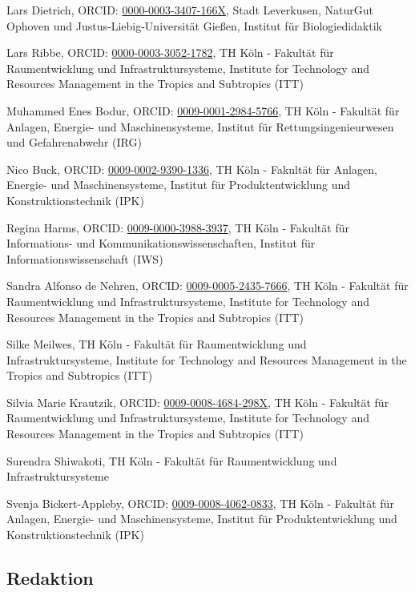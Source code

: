 Lars Dietrich, ORCID:
\href{https://orcid.org/0000-0003-3407-166X}{0000-0003-3407-166X}, Stadt
Leverkusen, NaturGut Ophoven und Justus-Liebig-Universität Gießen,
Institut für Biologiedidaktik

Lars Ribbe, ORCID:
\href{https://orcid.org/0000-0003-3052-1782}{0000-0003-3052-1782}, TH
Köln - Fakultät für Raumentwicklung und Infrastruktursysteme, Institute
for Technology and Resources Management in the Tropics and Subtropics
(ITT)

Muhammed Enes Bodur, ORCID:
\href{https://orcid.org/0009-0001-2984-5766}{0009-0001-2984-5766}, TH
Köln - Fakultät für Anlagen, Energie- und Maschinensysteme, Institut für
Rettungsingenieurwesen und Gefahrenabwehr (IRG)

Nico Buck, ORCID:
\href{https://orcid.org/0009-0002-9390-1336}{0009-0002-9390-1336}, TH
Köln - Fakultät für Anlagen, Energie- und Maschinensysteme, Institut für
Produktentwicklung und Konstruktionstechnik (IPK)

Regina Harms, ORCID:
\href{https://orcid.org/0009-0000-3988-3937}{0009-0000-3988-3937}, TH
Köln - Fakultät für Informations- und Kommunikationswissenschaften,
Institut für Informationswissenschaft (IWS)

Sandra Alfonso de Nehren, ORCID:
\href{https://orcid.org/0009-0005-2435-7666}{0009-0005-2435-7666}, TH
Köln - Fakultät für Raumentwicklung und Infrastruktursysteme, Institute
for Technology and Resources Management in the Tropics and Subtropics
(ITT)

Silke Meilwes, TH Köln - Fakultät für Raumentwicklung und
Infrastruktursysteme, Institute for Technology and Resources Management
in the Tropics and Subtropics (ITT)

Silvia Marie Krautzik, ORCID:
\href{https://orcid.org/0009-0008-4684-298X}{0009-0008-4684-298X}, TH
Köln - Fakultät für Raumentwicklung und Infrastruktursysteme, Institute
for Technology and Resources Management in the Tropics and Subtropics
(ITT)

Surendra Shiwakoti, TH Köln - Fakultät für Raumentwicklung und
Infrastruktursysteme

Svenja Bickert-Appleby, ORCID:
\href{https://orcid.org/0009-0008-4062-0833}{0009-0008-4062-0833}, TH
Köln - Fakultät für Anlagen, Energie- und Maschinensysteme, Institut für
Produktentwicklung und Konstruktionstechnik (IPK)

\subsection*{Redaktion}

